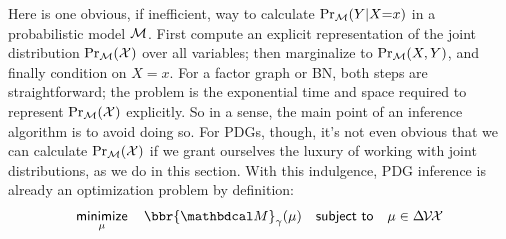 \documentclass[twoside]{article}
\begin{document}
Here is one obvious, if inefficient, way to calculate $\Pr_{\cal M}(Y|X{=}x)$ in a
probabilistic model $\cal M$. First compute an explicit representation of the joint distribution $\Pr_{\cal M}(\mathcal X)$ over all variables; then marginalize to $\Pr_{\cal M}(X,Y)$, and finally condition on $X\!=\!x$.
%
For a factor graph
or BN, both steps are straightforward; 
the problem is the exponential time and space required to represent $\Pr_{\cal M}(\mathcal X)$ explicitly.
So in a sense, the main point of an inference algorithm is to avoid doing so.
For PDGs, though, it's not even obvious that
we can calculate $\Pr_{\cal M}(\mathcal X)$ if we grant ourselves
the luxury of working with joint distributions, as we do in this section.
%
With this indulgence, 
PDG inference is already an optimization problem by definition:
\[
    \mathop{\text{\sf minimize}}\limits_\mu\quad
        \bbr{\dg M}_\gamma(\mu)
    \quad \text{\sf subject to}\quad \mu \in \Delta\mskip-2mu\V\mskip-2mu\X
\]
\end{document}
